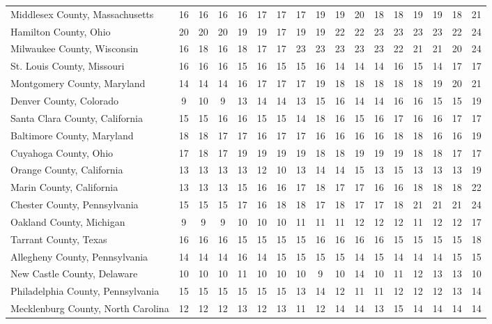 \begin{landscape}
\begin{longtable}{lcccccccccccccccc}
		Middlesex County, Massachusetts & 16 & 16 & 16 & 16 & 17 & 17 & 17 & 19 & 19 & 20 & 18 & 18 & 19 & 19 & 18 & 21 \\
		Hamilton County, Ohio & 20 & 20 & 20 & 19 & 19 & 17 & 19 & 19 & 22 & 22 & 23 & 23 & 23 & 23 & 22 & 24 \\
		Milwaukee County, Wisconsin & 16 & 18 & 16 & 18 & 17 & 17 & 23 & 23 & 23 & 23 & 23 & 22 & 21 & 21 & 20 & 24 \\
		St. Louis County, Missouri & 16 & 16 & 16 & 15 & 16 & 15 & 15 & 16 & 14 & 14 & 14 & 16 & 15 & 14 & 17 & 17 \\
		Montgomery County, Maryland & 14 & 14 & 14 & 16 & 17 & 17 & 17 & 19 & 18 & 18 & 18 & 18 & 18 & 19 & 20 & 21 \\
		Denver County, Colorado & 9 & 10 & 9 & 13 & 14 & 14 & 13 & 15 & 16 & 14 & 14 & 16 & 16 & 15 & 15 & 19 \\
		Santa Clara County, California & 15 & 15 & 16 & 16 & 15 & 15 & 14 & 18 & 16 & 15 & 16 & 17 & 16 & 16 & 17 & 17 \\
		Baltimore County, Maryland & 18 & 18 & 17 & 17 & 16 & 17 & 17 & 16 & 16 & 16 & 16 & 18 & 18 & 16 & 16 & 19 \\
		Cuyahoga County, Ohio & 17 & 18 & 17 & 19 & 19 & 19 & 19 & 18 & 18 & 19 & 19 & 19 & 18 & 18 & 17 & 17 \\
		Orange County, California & 13 & 13 & 13 & 13 & 12 & 10 & 13 & 14 & 14 & 15 & 13 & 15 & 13 & 13 & 13 & 19 \\
		Marin County, California & 13 & 13 & 13 & 15 & 16 & 16 & 17 & 18 & 17 & 17 & 16 & 16 & 18 & 18 & 18 & 22 \\
		Chester County, Pennsylvania & 15 & 15 & 15 & 17 & 16 & 18 & 18 & 17 & 18 & 17 & 17 & 18 & 21 & 21 & 21 & 24 \\
		Oakland County, Michigan & 9 & 9 & 9 & 10 & 10 & 10 & 11 & 11 & 11 & 12 & 12 & 12 & 11 & 12 & 12 & 17 \\
		Tarrant County, Texas & 16 & 16 & 16 & 15 & 15 & 15 & 15 & 16 & 16 & 16 & 16 & 15 & 15 & 15 & 15 & 18 \\
		Allegheny County, Pennsylvania & 14 & 14 & 14 & 16 & 14 & 15 & 15 & 15 & 15 & 14 & 15 & 14 & 14 & 14 & 15 & 15 \\
		New Castle County, Delaware & 10 & 10 & 10 & 11 & 10 & 10 & 10 & 9 & 10 & 14 & 10 & 11 & 12 & 13 & 13 & 10 \\
		Philadelphia County, Pennsylvania & 15 & 15 & 15 & 15 & 15 & 15 & 13 & 14 & 12 & 11 & 11 & 12 & 12 & 12 & 13 & 14 \\
		Mecklenburg County, North Carolina & 12 & 12 & 12 & 13 & 12 & 13 & 11 & 12 & 14 & 14 & 13 & 15 & 14 & 14 & 14 & 14 \\

\end{longtable}
\end{landscape}
